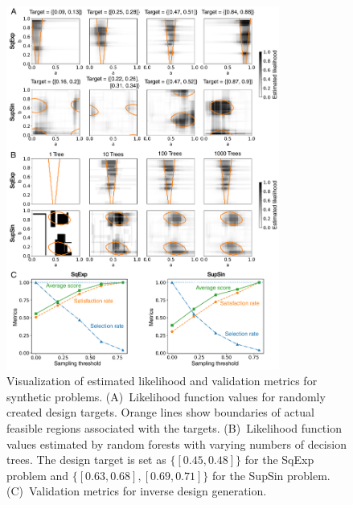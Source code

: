 \documentclass{article}
\begin{document}
\begin{figure}
\centering
\includegraphics[width=0.8\textwidth]{fig/synthetic_results.pdf}
\caption{Visualization of estimated likelihood and validation metrics for synthetic problems. (A)~Likelihood function values for randomly created design targets. Orange lines show boundaries of actual feasible regions associated with the targets. (B)~Likelihood function values estimated by random forests with varying numbers of decision trees. The design target is set as $\{[0.45, 0.48]\}$ for the SqExp problem and $\{[0.63, 0.68], [0.69, 0.71]\}$ for the SupSin problem. (C)~Validation metrics for inverse design generation.}
\label{fig:synthetic_results}
\end{figure}
\end{document}
